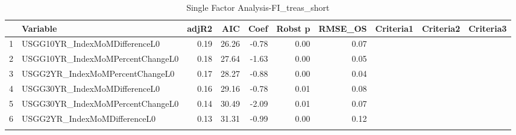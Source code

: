 \begin{longtable}{rlrrrrrlll}
  \hline
 & Variable & adjR2 & AIC & Coef & Robst p & RMSE\_OS & Criteria1 & Criteria2 & Criteria3 \\ 
  \hline
1 & USGG10YR\_IndexMoMDifferenceL0 & 0.19 & 26.26 & -0.78 & 0.00 & 0.07 &  &  &  \\ 
  2 & USGG10YR\_IndexMoMPercentChangeL0 & 0.18 & 27.64 & -1.63 & 0.00 & 0.05 &  &  &  \\ 
  3 & USGG2YR\_IndexMoMPercentChangeL0 & 0.17 & 28.27 & -0.88 & 0.00 & 0.04 &  &  &  \\ 
  4 & USGG30YR\_IndexMoMDifferenceL0 & 0.16 & 29.16 & -0.78 & 0.01 & 0.08 &  &  &  \\ 
  5 & USGG30YR\_IndexMoMPercentChangeL0 & 0.14 & 30.49 & -2.09 & 0.01 & 0.07 &  &  &  \\ 
  6 & USGG2YR\_IndexMoMDifferenceL0 & 0.13 & 31.31 & -0.99 & 0.00 & 0.12 &  &  &  \\ 
   \hline
\hline
\caption{Single Factor Analysis-FI_treas_short} 
\end{longtable}
